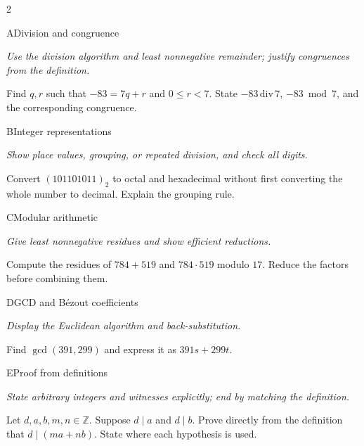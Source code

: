 \documentclass[9pt]{extarticle}
\begin{document}
\begin{multicols}{2}
\begin{CoreProblem}{A}{Division and congruence}
{\scriptsize\textit{Use the division algorithm and least nonnegative remainder; justify congruences from the definition.}\par}
Find $q,r$ such that $-83=7q+r$ and $0\le r<7$. State
$-83\,\mathrm{div}\,7$, $-83\bmod7$, and the corresponding congruence.
\end{CoreProblem}
\begin{CoreProblem}{B}{Integer representations}
{\scriptsize\textit{Show place values, grouping, or repeated division, and check all digits.}\par}
Convert $(101101011)_2$ to octal and hexadecimal without first converting the
whole number to decimal. Explain the grouping rule.
\end{CoreProblem}
\begin{CoreProblem}{C}{Modular arithmetic}
{\scriptsize\textit{Give least nonnegative residues and show efficient reductions.}\par}
Compute the residues of $784+519$ and $784\cdot519$ modulo $17$. Reduce the
factors before combining them.
\end{CoreProblem}
\columnbreak
\begin{CoreProblem}{D}{GCD and B\'ezout coefficients}
{\scriptsize\textit{Display the Euclidean algorithm and back-substitution.}\par}
Find $\gcd(391,299)$ and express it as $391s+299t$.
\end{CoreProblem}
\begin{CoreProblem}{E}{Proof from definitions}
{\scriptsize\textit{State arbitrary integers and witnesses explicitly; end by matching the definition.}\par}
Let $d,a,b,m,n\in\mathbb Z$. Suppose $d\mid a$ and $d\mid b$. Prove directly
from the definition that $d\mid(ma+nb)$. State where each hypothesis is used.
\end{CoreProblem}
\end{multicols}
\CoreWorkArea
\FormBreak
{}
\end{document}

